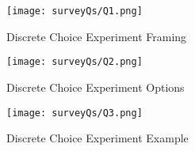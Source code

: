\documentclass[a4paper, 11pt]{article}
\begin{document}

\begin{landscape}

\end{landscape}
\begin{landscape}

\end{landscape}



\begin{figure}[htpb!]
  \begin{center}
    \caption{Discrete Choice Experiment Framing}
    \label{DCE-frame}
  \texttt{[image: surveyQs/Q1.png]}
  \end{center}
\end{figure}

\begin{figure}[htpb!]
  \begin{center}
    \caption{Discrete Choice Experiment Options}
    \label{DCE-options}
  \texttt{[image: surveyQs/Q2.png]}
  \end{center}
\end{figure}

\begin{figure}[htpb!]
  \begin{center}
    \caption{Discrete Choice Experiment Example}
    \label{DCE-example}
  \texttt{[image: surveyQs/Q3.png]}
  \end{center}
\end{figure}


%
\end{document}
